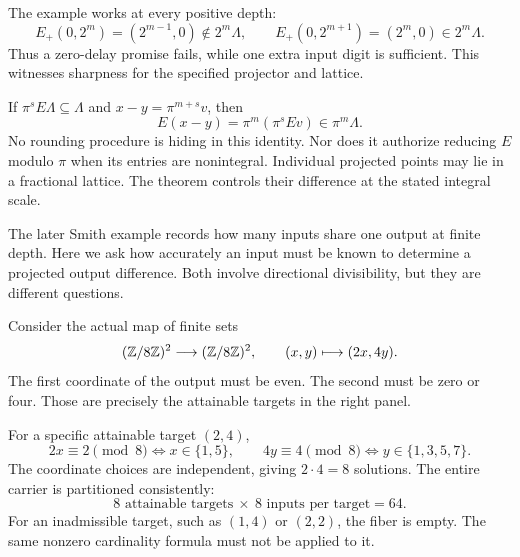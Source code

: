 
The example works at every positive depth:
\[
E_+(0,2^m)=(2^{m-1},0)\notin2^m\Lambda,
\qquad
E_+(0,2^{m+1})=(2^m,0)\in2^m\Lambda.
\]
Thus a zero-delay promise fails, while one extra input digit is sufficient. This witnesses sharpness for the specified projector and lattice.

If $\pi^sE\Lambda\subseteq\Lambda$ and $x-y=\pi^{m+s}v$, then
\[
E(x-y)=\pi^m(\pi^sEv)\in\pi^m\Lambda.
\]
No rounding procedure is hiding in this identity. Nor does it authorize reducing $E$ modulo $\pi$ when its entries are nonintegral. Individual projected points may lie in a fractional lattice. The theorem controls their difference at the stated integral scale.

The later Smith example records how many inputs share one output at finite depth. Here we ask how accurately an input must be known to determine a projected output difference. Both involve directional divisibility, but they are different questions.


Consider the actual map of finite sets
\[
(\mathbb Z/8\mathbb Z)^2\longrightarrow(\mathbb Z/8\mathbb Z)^2,
\qquad (x,y)\longmapsto(2x,4y).
\]
The first coordinate of the output must be even. The second must be zero or four. Those are precisely the attainable targets in the right panel.


For a specific attainable target $(2,4)$,
\[
2x\equiv2\pmod8\iff x\in\{1,5\},\qquad
4y\equiv4\pmod8\iff y\in\{1,3,5,7\}.
\]
The coordinate choices are independent, giving $2\cdot4=8$ solutions. The entire carrier is partitioned consistently:
\[
8\text{ attainable targets}\ \times\ 8\text{ inputs per target}=64.
\]
For an inadmissible target, such as $(1,4)$ or $(2,2)$, the fiber is empty. The same nonzero cardinality formula must not be applied to it.

